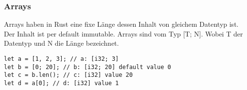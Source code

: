 \subsubsection{Arrays}
Arrays haben in Rust eine fixe Länge dessen Inhalt von gleichem Datentyp ist.
Der Inhalt ist per default immutable. Arrays sind vom Typ [T; N]. Wobei T der Datentyp und N die Länge bezeichnet.
\begin{lstlisting}
let a = [1, 2, 3]; // a: [i32; 3]
let b = [0; 20]; // b: [i32; 20] default value 0
let c = b.len(); // c: [i32] value 20
let d = a[0]; // d: [i32] value 1
\end{lstlisting}